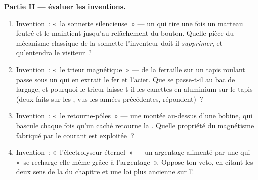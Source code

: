\begin{problem}
\medskip\noindent\textbf{Partie II --- évaluer les inventions.}
\begin{enumerate}[resume]
  \item Invention~: «~la sonnette silencieuse~» --- un
         qui tire une fois un marteau feutré et le
        maintient jusqu'au relâchement du bouton. Quelle pièce du
        mécanisme classique de la sonnette l'inventeur doit-il
        \emph{supprimer}, et qu'entendra le visiteur~?
  \item Invention~: «~le trieur magnétique~» --- de la ferraille
        sur un tapis roulant passe sous un  qui en
        extrait le fer et l'acier. Que se passe-t-il au bac de
        largage, et pourquoi le trieur laisse-t-il les canettes en
        aluminium sur le tapis (deux faits sur les , vus les
        années précédentes, répondent)~?
  \item Invention~: «~le retourne-pôles~» --- une  montée
        au-dessus d'une bobine, qui bascule chaque fois qu'un
         caché retourne la . Quelle propriété du
        magnétisme fabriqué par le courant est exploitée~?
  \item Invention~: «~l'électrolyseur éternel~» --- un argentage
        alimenté par une  qui «~se recharge elle-même grâce à
        l'argentage~». Oppose ton veto, en citant les deux sens de
        la  du chapitre et une loi plus ancienne sur l'.
\end{enumerate}


\end{problem}
